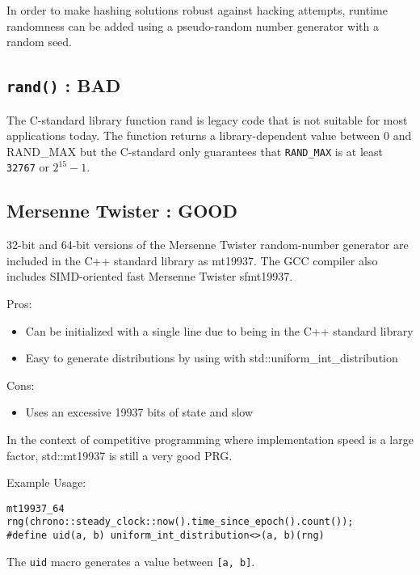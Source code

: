 \documentclass[12pt,a4paper]{article}
\begin{document}
In order to make hashing solutions robust against hacking attempts,
runtime randomness can be added using a pseudo-random number generator
with a random seed.

\subsection{\texorpdfstring{\texttt{rand()} :
        BAD}{rand() : BAD}}\label{rand-bad}

The C-standard library function rand is legacy code that is not suitable
for most applications today. The function returns a library-dependent
value between 0 and RAND\_MAX but the C-standard only guarantees that
\texttt{RAND\_MAX} is at least \texttt{32767} or \(2^{15} - 1\).\cite{randmax}

\subsection{Mersenne Twister : GOOD}\label{mersenne-twister-good}

32-bit and 64-bit versions of the Mersenne Twister random-number
generator are included in the C++ standard library as mt19937. The GCC
compiler also includes SIMD-oriented fast Mersenne Twister sfmt19937.

Pros: 
\begin{itemize}
    \item Can be initialized with a single line due to being in the C++
standard library
    \item Easy to generate distributions by using with std::uniform\_int\_distribution
\end{itemize}

Cons:
\begin{itemize}
    \item Uses an excessive 19937 bits of state and slow \cite{Sebastiano_2019}
\end{itemize}

\noindent In the context of competitive programming where implementation speed is
a large factor, std::mt19937 is still a very good PRG.

\noindent Example Usage:
\begin{verbatim}
mt19937_64 rng(chrono::steady_clock::now().time_since_epoch().count());
#define uid(a, b) uniform_int_distribution<>(a, b)(rng)
\end{verbatim}

\noindent The \texttt{uid} macro generates a value between \texttt{{[}a,\ b{]}}.
\end{document}
